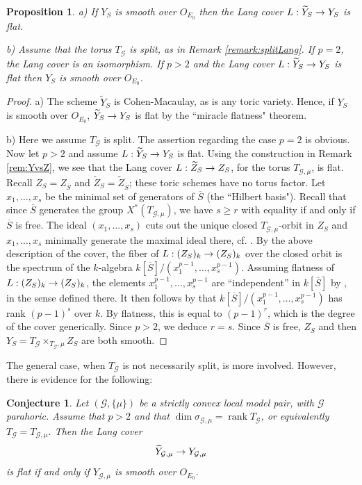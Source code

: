 \documentclass[reqno, 10pt]{amsart}
\makeatletter
\newcommand{\CG}{\ensuremath{\mathcal {G}}\xspace}
\DeclareMathOperator{\rank}{rank}
\newcommand{\wt}{\widetilde}
\newcommand{\ov}{\overline}
\newtheorem{proposition}[subsubsection]{Proposition}
\newtheorem {conjecture}[subsubsection]{Conjecture}
\theoremstyle{definition}
\numberwithin{equation}{subsection}
\numberwithin{subsubsection}{subsection}
\renewcommand{\to}{%
   \ifbool{@display}{\longrightarrow}{\rightarrow}%
   }
\makeatother
\begin{document}
  
 \begin{proposition}\label{flatL}
a) If $Y_S$ is smooth over $O_{E_0}$ then  the Lang cover $L: \wt Y_S\to Y_S$ is flat. 

b) Assume that the torus $T_\CG$ is split, as in Remark \ref{remark:splitLang}. If $p=2$, the Lang cover is an isomorphism.  
If $p>2$ and the Lang cover $L: \wt Y_S\to Y_S$ is flat then $Y_S$ is smooth over $O_{E_0}$.
\end{proposition}


\begin{proof}   a)  The scheme $\wt Y_{S}$ is Cohen-Macaulay, as is any toric variety. Hence, if $Y_S$ is smooth over $O_{E_0}$, $\wt Y_S\to Y_S$ is flat by the ``miracle flatness" theorem.  


b) Here we assume $T_\CG$ is split. The assertion regarding the case $p=2$ is obvious. Now let $p>2$ and assume $L: \wt Y_S\to Y_S$ is flat. Using the construction in Remark \ref{rem:YvsZ}, we see that the Lang cover $L: \wt Z_S\to Z_S$, for the torus $T_{\CG,\mu}$, is flat. Recall $Z_S=Z_{\ov S}$ and $\wt Z_S=\wt Z_{\ov S}$; these toric schemes have no torus factor.
 Let $x_1,\ldots, x_s$ be the minimal set of generators of $\ov S$ (the ``Hilbert basis"). Recall that since $\ov S$ generates the group $X^*(T_{\CG,\mu})$, we have $s\geq r$ with equality if and only if $\ov S$ is free. The ideal $(x_1,\ldots, x_s)$ cuts out the unique  closed $T_{\CG,\mu}$-orbit in $Z_S$ and $x_1,\ldots, x_s$ minimally generate the maximal ideal  there, cf.  \cite[Lemma 1.3.10]{CLS}.
By the above description of the cover, the fiber of $L: (Z_S)_k\to (Z_S)_k$ over the closed orbit is the spectrum of the $k$-algebra $k[\ov S]/(x^{p-1}_1,\ldots, x^{p-1}_s)$. Assuming flatness of $L: (Z_S)_k\to (Z_S)_k$, the elements $x^{p-1}_1,\ldots , x^{p-1}_s$ are ``independent'' in $k[\ov S]$  by \cite[Lem. 51.17.5]{Stacks}, in the sense defined there. It then follows by 
\cite[Lem. 51.17.4]{Stacks} that $k[\ov S]/(x^{p-1}_1,\ldots, x^{p-1}_s)$ has 
rank $(p-1)^s$
over $k$. By flatness, this is equal to $(p-1)^r$, which is the  degree of the cover generically. Since $p>2$, we deduce $r=s$. Since $\ov S$ is free, $Z_S$ and then $Y_S=T_\CG\times_{T_\CG,\mu}Z_S$ are both smooth. %
\end{proof}

The general case, when $T_\CG$ is not necessarily split, is more involved. However, there is evidence for the following:

 \begin{conjecture}\label{conjLco} Let $(\CG,\{\mu\})$ be a strictly convex local model pair, with  
  $\CG$  parahoric. Assume that $p>2$ and that $\dim\sigma_{\CG,\mu}=\rank T_{\CG}$, or equivalently $T_\CG=T_{\CG,\mu}$.
Then the Lang cover
\[
\wt Y_{\CG,\mu}\to Y_{\CG,\mu}
\]
is flat if and only if $Y_{\mathcal G,\mu}$ is smooth over $O_{E_0}$.
 \end{conjecture}
\end{document}
